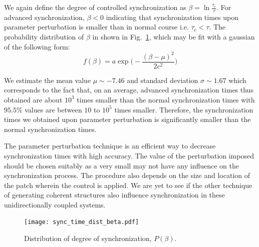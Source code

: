 \documentclass[reprint,superscriptaddress,amsmath,amssymb,aps,pre]{revtex4-1}
\begin{document}
We again define the degree of controlled synchronization as $\beta = \ln \frac{\tau_c}{\tau}$. For advanced synchronization, $\beta < 0$ indicating that synchronization times upon parameter perturbation is smaller than in normal course i.e. $\tau_c < \tau$. The probability distribution of $\beta$ in shown in Fig.~\ref{fig:beta_dist}, which may be fit with a gaussian of the following form:
\begin{equation}
f(\beta) =  a\exp\Big(-\frac{(\beta-\mu)^2}{2c^2}\Big)
\end{equation}

We estimate the mean value $\mu \sim -7.46$ and standard deviation $\sigma \sim1.67$ which corresponds to the fact that, on an average, advanced synchronization times thus obtained are about $10^3$ times smaller than the normal synchronization times with $95.5\%$ values are between $10$ to $10^5$ times smaller.  Therefore, the synchronization times we obtained upon parameter perturbation is significantly smaller than the normal synchronization times.  

The parameter perturbation technique is an efficient way to decrease synchronization times with high accuracy.  The value of the perturbation imposed should be chosen suitably as a very small may not have any influence on the synchronization process. The procedure also depends on the size and location of the patch wherein the control is applied. We are yet to see if the other technique of generating coherent structures also influence synchronization in these unidirectionally coupled systems. 
\begin{figure}[b]
	\texttt{[image: sync\_time\_dist\_beta.pdf]}
	\caption{\label{fig:beta_dist}\footnotesize Distribution of degree of synchronization, $P(\beta)$.}
\end{figure}
\end{document}
